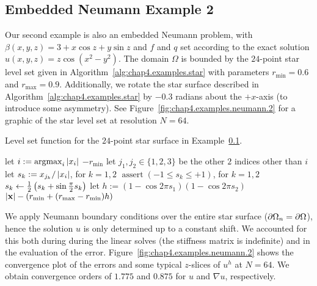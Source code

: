 \subsection{Embedded Neumann Example 2} \label{subsec:chap4.examples.neumann.2}

Our second example is also an embedded Neumann problem, with $\beta(x,y,z) = 3 + x \cos z + y \sin z$ and $f$ and $q$ set according to the exact solution $u(x,y,z) = z \cos \left( x^2 - y^2 \right)$. The domain $\Omega$ is bounded by the $24$-point star level set given in Algorithm~\ref{alg:chap4.examples.star} with parameters $r_{\text{min}} = 0.6$ and $r_{\text{max}} = 0.9$. Additionally, we rotate the star surface described in Algorithm~\ref{alg:chap4.examples.star} by $-0.3$ radians about the $+x$-axis (to introduce some asymmetry). See Figure~\ref{fig:chap4.examples.neumann.2} for a graphic of the star level set at resolution $N = 64$.

\begin{algorithm}[htbp]
\caption{Level set function for the $24$-point star surface in Example~\ref{subsec:chap4.examples.neumann.2}.}
\label{alg:chap4.examples.star}
\begin{algorithmic}[1]
\STATE {}
\STATE {}
\STATE let $i := \operatorname{argmax}_i \left\lvert x_i \right\rvert$
    \RETURN $-r_{\text{min}}$
\ENDIF
\STATE let $j_1, j_2 \in \{1, 2, 3\}$ be the other $2$ indices other than $i$
\STATE let $s_k := x_{j_k} / \left\lvert x_i \right\rvert$, for $k = 1,2$
\STATE {}
\STATE $\operatorname{assert}(-1 \leq s_k \leq +1)$, for $k = 1,2$
\STATE $s_k \leftarrow \frac{1}{2} \left( s_k + \sin \frac{\pi}{2} s_k \right)$ 
\STATE let $h := (1 - \cos 2 \pi s_1) (1 - \cos 2\pi s_2)$
\RETURN $\left\lvert \mathbf{x} \right\rvert - (r_{\text{min}} + (r_{\text{max}} - r_{\text{min}}) h)$
\end{algorithmic}
\end{algorithm}

We apply Neumann boundary conditions over the entire star surface ($\partial\Omega_n = \partial\Omega$), hence the solution $u$ is only determined up to a constant shift. We accounted for this both during during the linear solves (the stiffness matrix is indefinite) and in the evaluation of the error. Figure~\ref{fig:chap4.examples.neumann.2} shows the convergence plot of the errors and some typical $z$-slices of $u^h$ at $N = 64$. We obtain convergence orders of $1.775$ and $0.875$ for $u$ and $\nabla u$, respectively.


